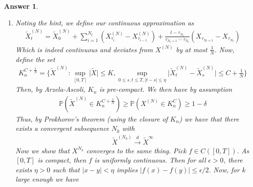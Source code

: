 \documentclass[12pt]{article}
\theoremstyle{colon}
\newtheorem*{answer}{Answer}
\begin{document}
\begin{answer}
\begin{enumerate}[label=\alph*)]
\begin{align*}
        &\quad + (X_{\tau_i} + \frac{1}{N})(X_{\tau_i}^{(N)} (1-X_{\tau_i}^{(N)})) \\
        &\quad + (X_{\tau_i} - \frac{1}{N})(X_{\tau_i}^{(N)} (1-X_{\tau_i}^{(N)})) - X_{\tau_i} \\
        &= X_{\tau_i} - X_{\tau_i} \\
        &= 0
      \end{align*}
      Therefore
      \begin{gather*}
        \mathbb{E}[X_t^{(N)} - X_s^{(N)} | \mathcal{F}_s] = \mathbb{E}[{N_t}] \mathbb{E}[\mathbb{E}[0 | \mathcal{F}_{\tau_i}] | \mathcal{F}_s] = 0
      \end{gather*}
      And so we conclude that $X^{(N)}$ is a martingale.

    \item Noting the hint, we define our continuous approximation as
      \begin{gather*}
        \tilde{X}_t^{(N)} = \tilde{X}_0^{(N)} + \sum_{i=1}^{N_t} (X_{\tau_i}^{(N)} - X_{\tau_{i-1}}^{(N)}) + \frac{t-\tau_{N_t}}{\tau_{N_t+1} - \tau_{N_t}} (X_{\tau_{N_t+1}} - X_{\tau_{N_t}})
      \end{gather*}
      Which is indeed continuous and deviates from $X^{(N)}$ by at most $\frac{1}{N}$. Now, define the set
      \begin{gather*}
        K_n^{C+\frac{1}{N}} = \{ \tilde{X}^{(N)} : \sup_{[0,T]} \lvert \tilde{X} \rvert \leq K, \sup_{0 \leq s,t \leq T, \lvert t-s \rvert \leq \eta} \lvert \tilde{X}_t^{(N)} - \tilde{X}_s^{(N)} \rvert \leq C + \frac{1}{N} \}
      \end{gather*}
      Then, by Arzela-Ascoli, $K_n$ is pre-compact. We then have by assumption
      \begin{gather*}
        \mathbb{P}(\tilde{X}^{(N)} \in K_n^{C + \frac{1}{N}}) \geq \mathbb{P} (X^{(N)} \in K_n^C) \geq 1-\delta
      \end{gather*}
      Thus, by Prokhorov's theorem (using the closure of $K_n$) we have that there exists a convergent subsequence $N_k$ with
      \begin{gather*}
        \tilde{X}^{(N_k)} \xrightarrow{d} \tilde{X}^\infty
      \end{gather*}
      Now we show that $X^{N_k}$ converges to the same thing. Pick $f \in C([0,T])$. As $[0,T]$ is compact, then $f$ is uniformly continuous. Then for all $\epsilon > 0$, there exists $\eta > 0 $ such that $\lvert x - y \rvert <\eta$ implies $\lvert f(x) - f(y) \rvert \leq \epsilon/2$. Now, for $k$ large enough we have

\end{enumerate}
\end{answer}
\end{document}
